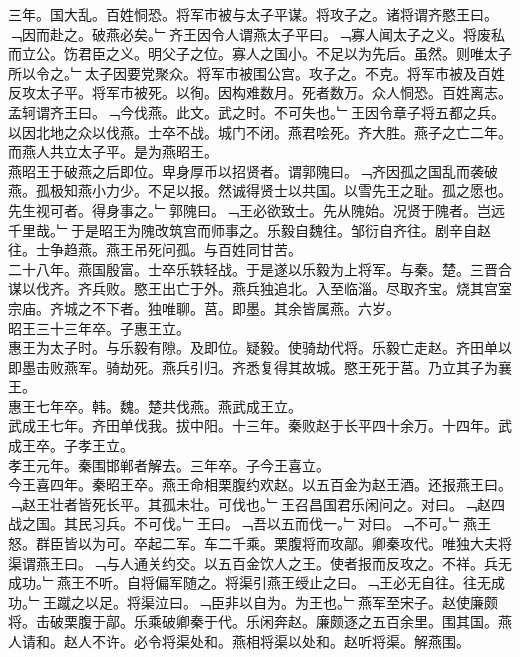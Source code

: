 \documentclass{zhvt-classic}
\begin{document}
\hspace*{2em}三年。国大乱。百姓恫恐。将军市被与太子平谋。将攻子之。诸将谓齐愍王曰。﹁因而赴之。破燕必矣。﹂齐王因令人谓燕太子平曰。﹁寡人闻太子之义。将废私而立公。饬君臣之义。明父子之位。寡人之国小。不足以为先后。虽然。则唯太子所以令之。﹂太子因要党聚众。将军市被围公宫。攻子之。不克。将军市被及百姓反攻太子平。将军市被死。以徇。因构难数月。死者数万。众人恫恐。百姓离志。孟轲谓齐王曰。﹁今伐燕。此文。武之时。不可失也。﹂王因令章子将五都之兵。以因北地之众以伐燕。士卒不战。城门不闭。燕君哙死。齐大胜。燕子之亡二年。而燕人共立太子平。是为燕昭王。\\
\hspace*{2em}燕昭王于破燕之后即位。卑身厚币以招贤者。谓郭隗曰。﹁齐因孤之国乱而袭破燕。孤极知燕小力少。不足以报。然诚得贤士以共国。以雪先王之耻。孤之愿也。先生视可者。得身事之。﹂郭隗曰。﹁王必欲致士。先从隗始。况贤于隗者。岂远千里哉。﹂于是昭王为隗改筑宫而师事之。乐毅自魏往。邹衍自齐往。剧辛自赵往。士争趋燕。燕王吊死问孤。与百姓同甘苦。\\
\hspace*{2em}二十八年。燕国殷富。士卒乐轶轻战。于是遂以乐毅为上将军。与秦。楚。三晋合谋以伐齐。齐兵败。愍王出亡于外。燕兵独追北。入至临淄。尽取齐宝。烧其宫室宗庙。齐城之不下者。独唯聊。莒。即墨。其余皆属燕。六岁。\\
\hspace*{2em}昭王三十三年卒。子惠王立。\\
\hspace*{2em}惠王为太子时。与乐毅有隙。及即位。疑毅。使骑劫代将。乐毅亡走赵。齐田单以即墨击败燕军。骑劫死。燕兵引归。齐悉复得其故城。愍王死于莒。乃立其子为襄王。\\
\hspace*{2em}惠王七年卒。韩。魏。楚共伐燕。燕武成王立。\\
\hspace*{2em}武成王七年。齐田单伐我。拔中阳。十三年。秦败赵于长平四十余万。十四年。武成王卒。子孝王立。\\
\hspace*{2em}孝王元年。秦围邯郸者解去。三年卒。子今王喜立。\\
\hspace*{2em}今王喜四年。秦昭王卒。燕王命相栗腹约欢赵。以五百金为赵王酒。还报燕王曰。﹁赵王壮者皆死长平。其孤未壮。可伐也。﹂王召昌国君乐闲问之。对曰。﹁赵四战之国。其民习兵。不可伐。﹂王曰。﹁吾以五而伐一。﹂对曰。﹁不可。﹂燕王怒。群臣皆以为可。卒起二军。车二千乘。栗腹将而攻鄗。卿秦攻代。唯独大夫将渠谓燕王曰。﹁与人通关约交。以五百金饮人之王。使者报而反攻之。不祥。兵无成功。﹂燕王不听。自将偏军随之。将渠引燕王绶止之曰。﹁王必无自往。往无成功。﹂王蹴之以足。将渠泣曰。﹁臣非以自为。为王也。﹂燕军至宋子。赵使廉颇将。击破栗腹于鄗。乐乘破卿秦于代。乐闲奔赵。廉颇逐之五百余里。围其国。燕人请和。赵人不许。必令将渠处和。燕相将渠以处和。赵听将渠。解燕围。\\
\end{document}
